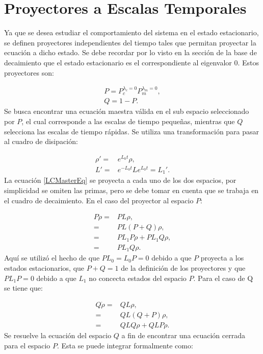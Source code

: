 \documentclass[a4paper,10pt]{report}
\begin{document}
\section{Proyectores a Escalas Temporales}

Ya que se desea estudiar el comportamiento del sistema en el estado estacionario, se definen proyectores independientes del tiempo tales que permitan proyectar la ecuación a dicho estado. Se debe recordar por lo visto en la sección de la base de decaimiento que el estado estacionario es el correspondiente al eigenvalor 0. Estos proyectores son:

\begin{align}
P = P_c^{\lambda_c = 0}P_m^{\lambda_m = 0},\\
Q = 1 - P.
\end{align} Se busca encontrar una ecuación maestra válida en el sub espacio seleccionado por $P$, el cual corresponde a las escalas de tiempo pequeñas, mientras que $Q$ selecciona las escalas de tiempo rápidas. Se utiliza una transformación para pasar al cuadro de disipación:

\begin{align*}
 \rho' =& e^{L_0t}\rho,\\
 L' =& e^{-L_0t}Le^{L_0t} = L_1'.
\end{align*} La ecuación \ref{LCMasterEq} se proyecta a cada uno de los dos espacios, por simplicidad se omiten las primas, pero se debe tomar en cuenta que se trabaja en el cuadro de decaimiento. En el caso del proyector al espacio $P$:

\begin{align*}
P\dot{\rho} =& PL\rho,\\
=& PL(P+Q)\rho,\\
=& PL_1P\rho + PL_1Q\rho,\\
=& PL_1Q\rho.
\end{align*} Aquí se utilizó el hecho de que $PL_0 = L_0P = 0$ debido a que $P$ proyecta a los estados estacionarios,  que $P+Q=1$ de la definición de los proyectores y que $PL_1P=0$ debido a que $L_1$ no concecta estados del espacio $P$. Para el caso de Q se tiene que:

\begin{align*}
Q\dot{\rho} =& QL\rho,\\
=& QL(Q+P)\rho,\\
=& QLQ\rho + QLP\rho.
\end{align*} Se resuelve la ecuación del espacio $Q$ a fin de encontrar una ecuación cerrada para el espacio $P$. Esta se puede integrar formalmente como:
\end{document}
